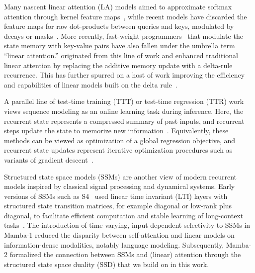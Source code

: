 \documentclass{article}
\newcommand{\citep}{\parencite}
\newcommand{\citet}{\textcite}
\theoremstyle{plain}
\theoremstyle{definition}
\theoremstyle{remark}
\begin{document}
Many nascent linear attention (LA) models aimed to approximate softmax attention through kernel feature maps~\citep{linearattention,performer}, while recent models have discarded the feature maps for raw dot-products between queries and keys, modulated by decays or masks~\citep{sun2023retentivenetworksuccessortransformer,yang2024gatedlinearattentiontransformers}.
More recently, fast-weight programmers~\citet{schlag2021deltarule} that modulate the state memory with key-value pairs have also fallen under the umbrella term ``linear attention.''
\citet{yang2025gateddeltanetworksimproving,yang2025parallelizinglineartransformersdelta} originated from this line of work and enhanced traditional linear attention by replacing the additive memory update with a delta-rule recurrence.
This has further spurred on a host of work improving the efficiency and capabilities of linear models built on the delta rule~\citep{kimiteam2025kimilinearexpressiveefficient, hu2025combaimprovingbilinearrnns}.

A parallel line of test-time training (TTT) or test-time regression (TTR) work views sequence modeling as an online learning task during inference.
Here, the recurrent state represents a compressed summary of past inputs, and recurrent steps update the state to memorize new information~\citep{sun2025learninglearntesttime,zhang2025testtimetrainingright,tandon2025endtoendtesttimetraininglong}.
Equivalently, these methods can be viewed as optimization of a global regression objective, and recurrent state updates represent iterative optimization procedures such as variants of gradient descent~\citep{wang2025testtimeregressionunifyingframework}.

Structured state space models (SSMs) are another view of modern recurrent models inspired by classical signal processing and dynamical systems.
Early versions of SSMs such as S4~\citep{S4,S5,DSS} used linear time invariant (LTI) layers with structured state transition matrices, for example diagonal or low-rank plus diagonal, to facilitate efficient computation and stable learning of long-context tasks~\citep{S4,S5,DSS}.
The introduction of time-varying, input-dependent selectivity to SSMs in Mamba-1 \citep{gu2024mambalineartimesequencemodeling} reduced the disparity between self-attention and linear models on information-dense modalities, notably language modeling.
Subsequently, Mamba-2 \citep{dao2024transformersssmsgeneralizedmodels} formalized the connection between SSMs and (linear) attention through the structured state space duality (SSD) that we build on in this work.
\end{document}
